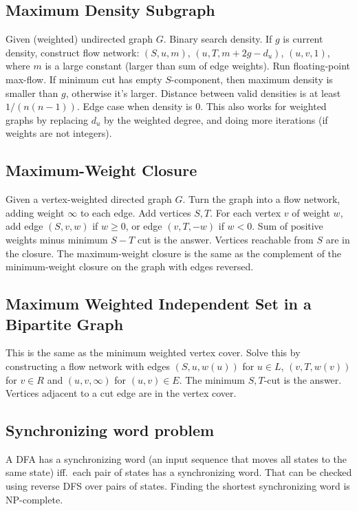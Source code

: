     \subsection{Maximum Density Subgraph}
Given (weighted) undirected graph $G$. Binary search density. If $g$ is
current density, construct flow network: $(S, u, m)$, $(u, T,
m+2g-d_u)$, $(u,v,1)$, where $m$ is a large constant (larger than sum
of edge weights). Run floating-point max-flow. If minimum cut has empty
$S$-component, then maximum density is smaller than $g$, otherwise it's
larger. Distance between valid densities is at least $1/(n(n-1))$. Edge
case when density is $0$. This also works for weighted graphs by
replacing $d_u$ by the weighted degree, and doing more iterations (if
weights are not integers).\newline

\subsection{Maximum-Weight Closure}
Given a vertex-weighted directed graph $G$. Turn the graph into a flow
network, adding weight $\infty$ to each edge. Add vertices $S,T$. For
each vertex $v$ of weight $w$, add edge $(S,v,w)$ if $w\geq 0$, or edge
$(v,T,-w)$ if $w<0$. Sum of positive weights minus minimum $S-T$ cut is
the answer. Vertices reachable from $S$ are in the closure. The
maximum-weight closure is the same as the complement of the
minimum-weight closure on the graph with edges reversed.\newline
\subsection{Maximum Weighted Independent Set in a Bipartite Graph}
This is the same as the minimum weighted vertex cover. Solve this by
constructing a flow network with edges $(S,u,w(u))$ for $u\in L$,
$(v,T,w(v))$ for $v\in R$ and $(u,v,\infty)$ for $(u,v)\in E$. The
minimum $S,T$-cut is the answer. Vertices adjacent to a cut edge are
in the vertex cover.\newline
\subsection{Synchronizing word problem}
A DFA has a synchronizing word (an input sequence that moves all states
to the same state) iff.\ each pair of states has a synchronizing word.
That can be checked using reverse DFS over pairs of states. Finding the
shortest synchronizing word is NP-complete.\newline

